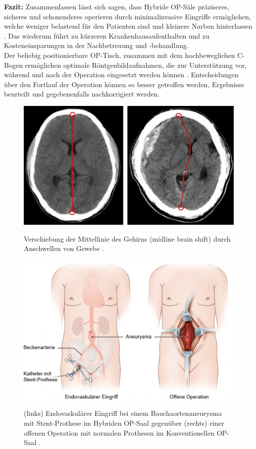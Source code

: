 \textbf{Fazit:} Zusammenfassen lässt sich sagen, dass Hybride OP-Säle präziseres, sicheres und schonenderes operieren durch minimalinvasive Eingriffe ermöglichen, welche weniger belastend für den Patienten sind und kleinere Narben hinterlassen \cite{DresdnerUniklinikum}. Das wiederum  führt zu kürzeren Krankenhausaufenthalten und zu Kosteneinsparungen in der Nachbetreuung und -behandlung. \\
Der beliebig positionierbare OP-Tisch, zusammen mit dem hochbeweglichen C-Bogen  ermöglichen optimale Röntgenbildaufnahmen, die zur Unterstützung vor, während und nach der Operation eingesetzt werden können \cite{DresdnerUniklinikum}. Entscheidungen über den Fortlauf der Operation können so besser getroffen werden, Ergebnisse beurteilt und gegebenenfalls nachkorrigiert werden.

\begin{figure}[!htb]
	\includegraphics[width=\linewidth]{Content/Pictures/brainshift.png}
	\caption{Verschiebung der Mittellinie des Gehirns (midline brain shift) durch Anschwellen von Gewebe \cite{BrainShiftImage}.}
	\label{fig:brainshift}
	\endminipage\hfill
	\includegraphics[width=\linewidth]{Content/Pictures/bauchaorten.png}
	\caption{(links) Endovaskulärer Eingriff bei einem Bauchaortenaneurysma mit Stent-Prothese im Hybriden OP-Saal gegenüber (rechts) einer offenen Operation mit normalen Prothesen im Konventionellen OP-Saal \cite{BauaortenaneurysmaBild}.}
	\label{fig:bauchaorten}
	\endminipage
\end{figure}